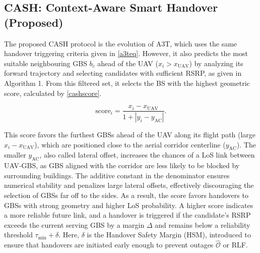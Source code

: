 \documentclass[conference]{IEEEtran}
\newcommand*\zc[1]{\textcolor{blue}{Zach: #1}}
\begin{document}
\subsection{CASH: Context-Aware Smart Handover (Proposed)}
The proposed CASH protocol is the evolution of A3T, which uses the same handover triggering criteria given in \eqref{a3teq}. However, it also predicts the most suitable neighbouring GBS $b_{c}$ ahead of the UAV ($x_i > x_{\text{UAV}}$) by analyzing its forward trajectory and selecting candidates with sufficient RSRP, as given in Algorithm 1. From this filtered set, it selects the BS with the highest geometric score, calculated by \eqref{cashscore}.

\begin{equation}
\label{cashscore}
\text{score}_i = \frac{x_i - x_{\text{UAV}}}{1 + |y_i - y_{\text{AC}}|}.
\end{equation}

This score favors the furthest GBSs ahead of the UAV along its flight path (large $x_i - x_{\text{UAV}}$), which are positioned close to the aerial corridor centerline ($ y_{\text{AC}}$). The smaller $y_{\text{AC}}$, also called lateral offset, increases the chances of a LoS link between UAV-GBS, as GBS aligned with the corridor are less likely to be blocked by surrounding buildings. The additive constant in the denominator ensures numerical stability and penalizes large lateral offsets, effectively discouraging the selection of GBSs far off to the sides. As a result, the score favors handovers to GBSs with strong geometry and higher LoS probability. A higher score indicates a more reliable future link, and a handover is triggered if the candidate’s RSRP exceeds the current serving GBS by a margin $\Delta$ and remains below a reliability threshold $\tau_{\min} + \delta$. Here, $\delta$ is the Handover Safety Margin (HSM), introduced to ensure that handovers are initiated early enough to prevent outages $\hat{\mathcal{O}}$ or RLF. 




\end{document}
